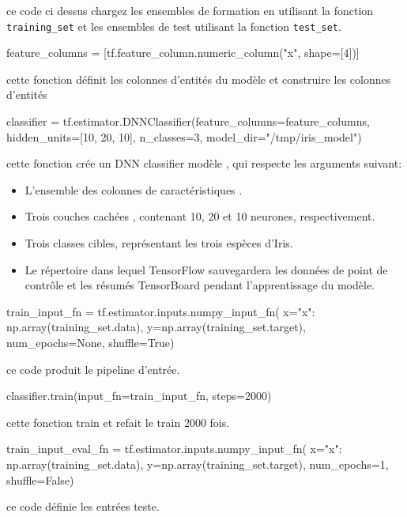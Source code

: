 \documentclass[a4paper,11pt]{book}
\theoremstyle{theo}
\begin{document}
ce code ci dessus  chargez les ensembles de formation  en utilisant la fonction \verb+training_set+ et les ensembles de  test utilisant la fonction \verb+test_set+.
\begin{mypython}
feature_columns = [tf.feature_column.numeric_column("x", shape=[4])]
\end{mypython}
cette fonction  définit les colonnes d'entités du modèle et construire les colonnes d'entités

\begin{mypython}
classifier = tf.estimator.DNNClassifier(feature_columns=feature_columns,
                                          hidden_units=[10, 20, 10],
                                          n_classes=3,
                                          model_dir="/tmp/iris_model")
\end{mypython}

cette fonction crée un DNN classifier  modèle ,  qui respecte  les arguments suivant:
\begin{itemize}

\item	L'ensemble des colonnes de caractéristiques .
\item	Trois couches cachées , contenant 10, 20 et 10 neurones, respectivement.
\item	Trois classes cibles, représentant les trois espèces d'Iris.
\item Le répertoire dans lequel TensorFlow sauvegardera les données de point de contrôle et les résumés TensorBoard pendant l'apprentissage du modèle.

\end{itemize}

\begin{mypython}
train_input_fn = tf.estimator.inputs.numpy_input_fn(
      x={"x": np.array(training_set.data)},
      y=np.array(training_set.target),
      num_epochs=None,
      shuffle=True)
\end{mypython}
ce code  produit le pipeline d'entrée.
\begin{mypython}
classifier.train(input_fn=train_input_fn, steps=2000)
\end{mypython}
cette fonction  train  et refait le train  2000 fois.

\begin{mypython}
train_input_eval_fn = tf.estimator.inputs.numpy_input_fn(
      x={"x": np.array(training_set.data)},
      y=np.array(training_set.target),
      num_epochs=1,
      shuffle=False)
\end{mypython}
ce code  définie les entrées teste.
\end{document}
